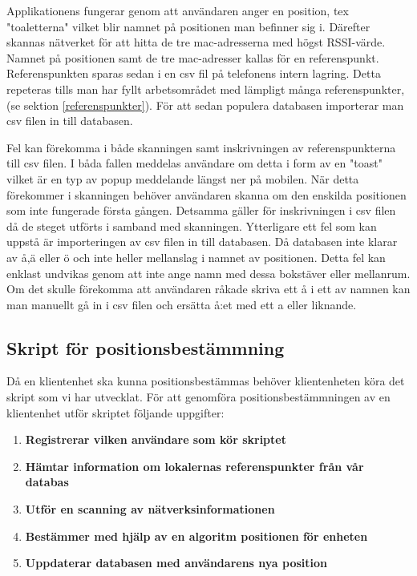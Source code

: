 \documentclass[swedish, a4paper,12pt]{article}
\begin{document}
Applikationens fungerar genom att användaren anger en position, tex "toaletterna" vilket blir namnet på positionen man befinner sig i. Därefter skannas nätverket för att hitta de tre mac-adresserna med högst RSSI-värde. Namnet på positionen samt de tre mac-adresser kallas för en referenspunkt. Referenspunkten sparas sedan i en csv fil på telefonens intern lagring. Detta repeteras tills man har fyllt arbetsområdet med lämpligt många referenspunkter, (se sektion \ref{referenspunkter}). För att sedan populera databasen importerar man csv filen in till databasen.

Fel kan förekomma i både skanningen samt inskrivningen av referenspunkterna till csv filen. I båda fallen meddelas användare om detta i form av en "toast" vilket är en typ av popup meddelande längst ner på mobilen. När detta förekommer i skanningen behöver användaren skanna om den enskilda positionen som inte fungerade första gången. Detsamma gäller för inskrivningen i csv filen då de steget utförts i samband med skanningen. Ytterligare ett fel som kan uppstå är importeringen av csv filen in till databasen. Då databasen inte klarar av å,ä eller ö och inte heller mellanslag i namnet av positionen. Detta fel kan enklast undvikas genom att inte ange namn med dessa bokstäver eller mellanrum. Om det skulle förekomma att användaren råkade skriva ett å i ett av namnen kan man manuellt gå in i csv filen och ersätta å:et med ett a eller liknande.

\subsection{Skript för positionsbestämmning}
Då en klientenhet ska kunna positionsbestämmas behöver klientenheten köra det skript som vi har utvecklat. För att genomföra positionsbestämmningen av en klientenhet utför skriptet följande uppgifter:
\begin{enumerate}
  \item \textbf{Registrerar vilken användare som kör skriptet}
  \item \textbf{Hämtar information om lokalernas referenspunkter från vår databas}
  \item \textbf{Utför en scanning av nätverksinformationen}
  \item \textbf{Bestämmer med hjälp av en algoritm positionen för enheten}
  \item \textbf{Uppdaterar databasen med användarens nya position}
\end{enumerate}
\end{document}
